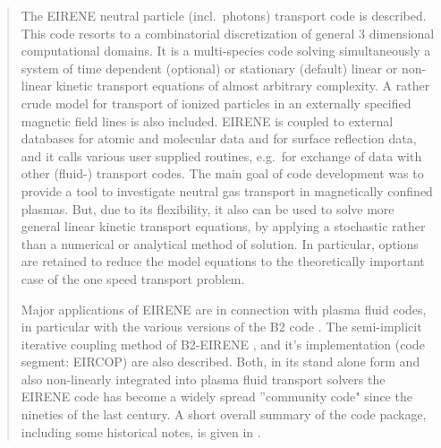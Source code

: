 \documentclass[%
  12pt,
  DIV=13,
  abstract=true,
  chapterprefix=true,
  numbers=noendperiod,
  toc=bib
]{scrreprt}
\begin{document}
  \begin{abstract}\label{abstract}
    The EIRENE neutral particle (incl.\ photons) transport code \cite{kn:Reiter92a} 
    is described.
    This code resorts to a combinatorial discretization of general 3 dimensional
    computational domains. 
    It is a multi-species code solving simultaneously a system of time dependent 
    (optional) or stationary (default) linear or non-linear kinetic transport 
    equations of almost arbitrary complexity. 
    A rather crude model for transport of ionized particles in an externally 
    specified magnetic field lines is also included. 
    EIRENE is coupled to external databases for atomic and molecular data and for 
    surface reflection data, and it calls various user supplied routines, e.g.\ 
    for exchange of data with other (fluid-) transport codes. 
    The main goal of code development was to provide a tool to investigate neutral 
    gas transport in magnetically confined plasmas. 
    But, due to its flexibility, it also can be used to solve more general linear 
    kinetic transport equations, by applying a stochastic rather than a numerical 
    or analytical method of solution.
    In particular, options are retained to reduce the model equations to the
    theoretically important case of the one speed transport problem.

    Major applications of EIRENE are in connection with plasma fluid codes, in 
    particular with the various versions of the B2 code \cite{kn:Braams}.
    The semi-implicit iterative coupling method of B2-EIRENE \cite{kn:Reiter91b},
    \cite{kn:Reiter92b} and it's implementation (code segment: EIRCOP) are also 
    described.
    Both, in its stand alone form and also non-linearly integrated into plasma 
    fluid transport solvers the EIRENE code has become a widely spread 
    ''community code" since the nineties of the last century.
    A short overall summary of the code package, including some historical notes, 
    is given in \cite{kn:Reiter2004}.
  \end{abstract}

  \renewcommand\thechapter{\Roman{chapter}}

  

  \tableofcontents

  

  \renewcommand{\theHchapter}{arabicchapter.\thechapter}
  \renewcommand\thechapter{\arabic{chapter}}
  \pagenumbering{arabic}
\end{document}
